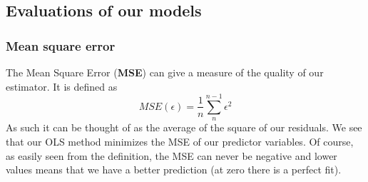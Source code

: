 \subsection{Evaluations of our models}


\subsubsection{Mean square error}
The Mean Square Error (\textbf{MSE}) can give a measure of the quality of our estimator. It is defined as
\begin{equation}\label{eq: mse}
	MSE(\epsilon) = \frac{1}{n}\sum_n^{n-1}\epsilon^2
\end{equation}
As such it can be thought of  as the average of the square of our residuals. We see that our OLS method minimizes the MSE of our predictor variables. Of course, as easily seen from the definition, the MSE can never be negative and lower values means that we have a better prediction (at zero there is a perfect fit).


